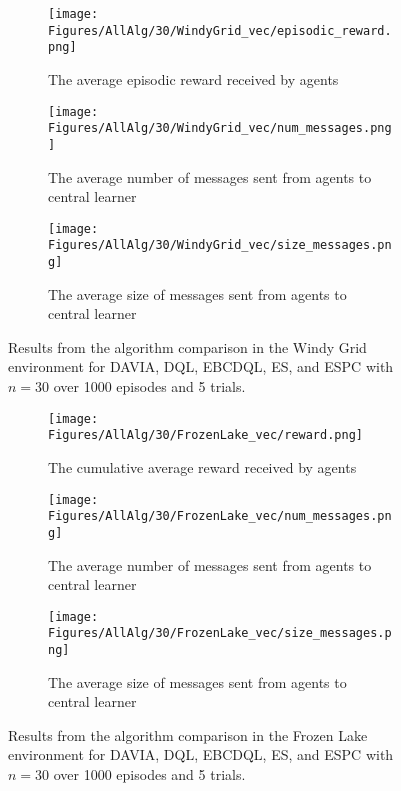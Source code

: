 \begin{figure}[H]
    \centering
    \begin{subfigure}{0.4\textwidth}
        \centering
        \texttt{[image: Figures/AllAlg/30/WindyGrid\_vec/episodic\_reward.png]}
        \caption{The average episodic reward received by agents}
        \label{fig:AlgsWGReward}
    \end{subfigure}
    \begin{subfigure}{0.4\textwidth}
        \centering
        \texttt{[image: Figures/AllAlg/30/WindyGrid\_vec/num\_messages.png]}
        \caption{The average number of messages sent from agents to central learner}
        \label{fig:AlgsWGNumMessages}
    \end{subfigure}
    \begin{subfigure}{0.4\textwidth}
        \centering
        \texttt{[image: Figures/AllAlg/30/WindyGrid\_vec/size\_messages.png]}
        \caption{The average size of messages sent from agents to central learner}
        \label{fig:AlgsWGSizeMessages}
    \end{subfigure}
    \caption{Results from the algorithm comparison in the Windy Grid environment for DAVIA, DQL, EBCDQL, ES, and ESPC with $n=30$ over 1000 episodes and 5 trials.}
    \label{fig:AlgsWG}
\end{figure}

\begin{figure}[H]
    \centering
    \begin{subfigure}{0.4\textwidth}
        \centering
        \texttt{[image: Figures/AllAlg/30/FrozenLake\_vec/reward.png]}
        \caption{The cumulative average reward received by agents}
        \label{fig:AlgsFLReward}
    \end{subfigure}
    \begin{subfigure}{0.4\textwidth}
        \centering
        \texttt{[image: Figures/AllAlg/30/FrozenLake\_vec/num\_messages.png]}
        \caption{The average number of messages sent from agents to central learner}
        \label{fig:AlgsFLNumMessages}
    \end{subfigure}
    \begin{subfigure}{0.4\textwidth}
        \centering
        \texttt{[image: Figures/AllAlg/30/FrozenLake\_vec/size\_messages.png]}
        \caption{The average size of messages sent from agents to central learner}
        \label{fig:AlgsFLSizeMessages}
    \end{subfigure}
    \caption{Results from the algorithm comparison in the Frozen Lake environment for DAVIA, DQL, EBCDQL, ES, and ESPC with $n=30$ over 1000 episodes and 5 trials.}
    \label{fig:AlgsFL}
\end{figure}



